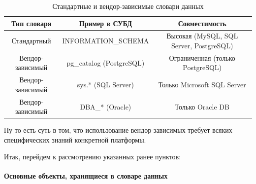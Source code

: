 \begin{table}[H]
    \centering
    \begin{tabular}{|c|c|c|}
        \hline
        \textbf{Тип словаря} & \textbf{Пример в СУБД} & \textbf{Совместимость} \\
        \hline
        Стандартный & INFORMATION\_SCHEMA & Высокая (MySQL, SQL Server, PostgreSQL) \\
        \hline
        Вендор-зависимый & pg\_catalog (PostgreSQL) & Ограниченная (только PostgreSQL) \\
        \hline
        Вендор-зависимый & sys.* (SQL Server) & Только Microsoft SQL Server \\
        \hline
        Вендор-зависимый & DBA\_* (Oracle) & Только Oracle DB \\
        \hline
    \end{tabular}
    \caption{Стандартные и вендор-зависимые словари данных}
    \label{tab:data_dictionary_comparison}
\end{table}

Ну то есть суть в том, что использование вендор-зависимых требует всяких специфических знаний конкретной платформы.

Итак, перейдем к рассмотрению указанных ранее пунктов:

\paragraph{Основные объекты, хранящиеся в словаре данных} ~\\

